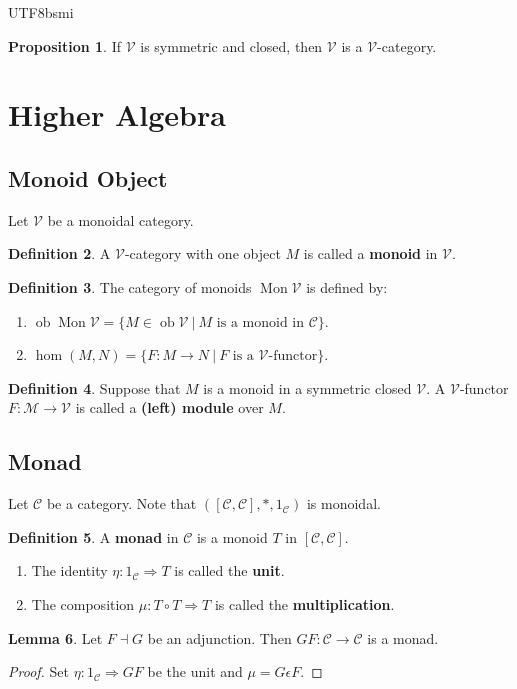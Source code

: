 \documentclass[12pt]{article}
\theoremstyle{definition}
\newtheorem{definition}{Definition}[section]
\newtheorem{property}[definition]{Proposition}
\newtheorem{lemma}[definition]{Lemma}
\newcommand\<{\langle}
\renewcommand\>{\rangle}
\DeclareMathOperator{\Mon}{Mon}
\DeclareMathOperator{\ob}{ob}
\begin{document}
\begin{CJK}{UTF8}{bsmi}
\begin{property}
    If $\mathcal{V}$ is symmetric and closed, then $\mathcal{V}$ is a $\mathcal{V}$-category.
\end{property}

\section{Higher Algebra}

\subsection{Monoid Object}

Let $\mathcal{V}$ be a monoidal category.

\begin{definition}
    A $\mathcal{V}$-category with one object $M$ is called a \textbf{monoid} in $\mathcal{V}$.
\end{definition}

\begin{definition}
    The category of monoids $\Mon\mathcal{V}$ is defined by:
    \begin{enumerate}
        \item $\ob \Mon\mathcal{V}=\{M\in\ob\mathcal{V}\ |\ M\text{ is a monoid in }\mathcal{C}\}$.
        \item $\hom(M, N)=\{F:M\to N\ |\ F\text{ is a $\mathcal{V}$-functor}\}$.
    \end{enumerate}
\end{definition}

\begin{definition}
    Suppose that $M$ is a monoid in a symmetric closed $\mathcal{V}$.
    A $\mathcal{V}$-functor $F:\mathcal{M}\to\mathcal{V}$ is called a \textbf{(left) module} over $M$.
\end{definition}

\subsection{Monad}

Let $\mathcal{C}$ be a category.
Note that $([\mathcal{C}, \mathcal{C}], *, 1_\mathcal{C})$ is monoidal.

\begin{definition}
    A \textbf{monad} in $\mathcal{C}$ is a monoid $T$ in $[\mathcal{C}, \mathcal{C}]$.
    \begin{enumerate}
        \item The identity $\eta:1_\mathcal{C}\Rightarrow T$ is called the \textbf{unit}.
        \item The composition $\mu:T\circ T\Rightarrow T$ is called the \textbf{multiplication}.
    \end{enumerate}
\end{definition}

\begin{lemma}
    Let $F\dashv G$ be an adjunction.
    Then $GF:\mathcal{C}\to\mathcal{C}$ is a monad.
\end{lemma}
\begin{proof}
    Set $\eta:1_\mathcal{C}\Rightarrow GF$ be the unit and $\mu=G\epsilon F$.
\end{proof}

\end{CJK}
\end{document}
